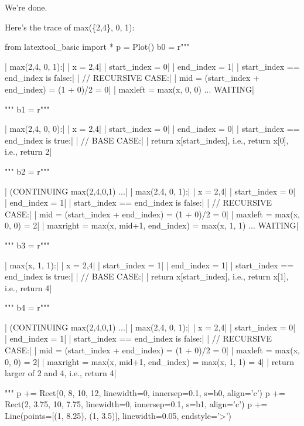 We're done.

Here's the trace of max(\{2,4\}, 0, 1):
\begin{python}
from latextool_basic import *
p = Plot()
b0 = r"""
\begin{consolethree}[escapeinside=||]
|{ \tiny max({2,4}, 0, 1):}|
    |{ \tiny x = {2,4}}|
    |{ \tiny start\_index = 0}|
    |{ \tiny end\_index = 1}|
    |{ \tiny start\_index == end\_index is false:}|
        |{ \tiny // RECURSIVE CASE:}|
        |{ \tiny mid = (start\_index + end\_index) = (1 + 0)/2 = 0}|
        |{ \tiny maxleft = max(x, 0, 0) ... WAITING}|
\end{consolethree}
"""
b1 = r"""
\begin{consolethree}[escapeinside=||]
|{ \tiny max({2,4}, 0, 0):}|
    |{ \tiny x = {2,4}}|
    |{ \tiny start\_index = 0}|
    |{ \tiny end\_index = 0}|
    |{ \tiny start\_index == end\_index is true:}|
        |{ \tiny // BASE CASE:}|
        |{ \tiny return x[start\_index], i.e., return x[0], i.e., return 2}|
\end{consolethree}
"""
b2 = r"""
\begin{consolethree}[escapeinside=||]
|{ \tiny (CONTINUING max({2,4},0,1) ...}|
|{ \tiny max({2,4}, 0, 1):}|
    |{ \tiny x = {2,4}}|
    |{ \tiny start\_index = 0}|
    |{ \tiny end\_index = 1}|
    |{ \tiny start\_index == end\_index is false:}|
        |{ \tiny // RECURSIVE CASE:}|
        |{ \tiny mid = (start\_index + end\_index) = (1 + 0)/2 = 0}|
        |{ \tiny maxleft = max(x, 0, 0) = 2}|
        |{ \tiny maxright = max(x, mid+1, end\_index) = max(x, 1, 1) ... WAITING}|
\end{consolethree}
"""
b3 = r"""
\begin{consolethree}[escapeinside=||]
|{ \tiny max(x, 1, 1):}|
    |{ \tiny x = {2,4}}|
    |{ \tiny start\_index = 1}|
    |{ \tiny end\_index = 1}|
    |{ \tiny start\_index == end\_index is true:}|
        |{ \tiny // BASE CASE:}|
        |{ \tiny return x[start\_index], i.e., return x[1], i.e., return 4}|
\end{consolethree}
"""
b4 = r"""
\begin{consolethree}[escapeinside=||]
|{ \tiny (CONTINUING max({2,4},0,1) ...}|
|{ \tiny max({2,4}, 0, 1):}|
    |{ \tiny x = {2,4}}|
    |{ \tiny start\_index = 0}|
    |{ \tiny end\_index = 1}|
    |{ \tiny start\_index == end\_index is false:}|
        |{ \tiny // RECURSIVE CASE:}|
        |{ \tiny mid = (start\_index + end\_index) = (1 + 0)/2 = 0}|
        |{ \tiny maxleft = max(x, 0, 0) = 2}|
        |{ \tiny maxright = max(x, mid+1, end\_index) = max(x, 1, 1) = 4}|
        |{ \tiny return larger of 2 and 4, i.e., return 4}|
\end{consolethree}
"""
p += Rect(0, 8, 10, 12, linewidth=0, innersep=0.1, s=b0, align='c')
p += Rect(2, 3.75, 10, 7.75, linewidth=0, innersep=0.1, s=b1, align='c')
p += Line(points=[(1, 8.25), (1, 3.5)], linewidth=0.05, endstyle='>')


\end{python}
